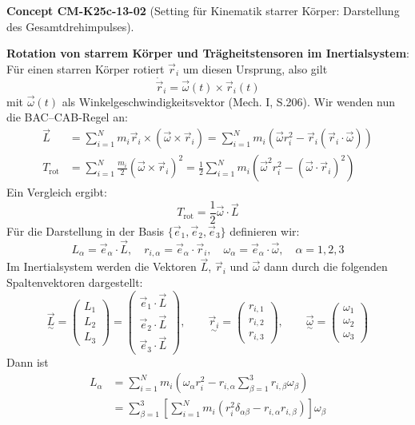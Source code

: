 \documentclass[10pt, letterpaper]{article}
\newcommand{\CustomHeading}[3]{%
  \par\medskip\noindent%
  \textbf{#1 #2} \textnormal{(#3)}.\enskip%
}
\newenvironment{CONC}[2]{\begin{unitbox}\CustomHeading{Concept}{#1}{#2}}{\end{unitbox}}
\begin{document}
\begin{CONC}{CM-K25c-13-02}{Setting für Kinematik starrer Körper: Darstellung des Gesamtdrehimpulses}
\textbf{Rotation von starrem Körper und Trägheitstensoren im Inertialsystem}: Für einen starren Körper rotiert $\vec{r}_i$ um diesen Ursprung, also gilt
\[
\dot{\vec{r}}_i = \vec{\omega}(t) \times \vec{r}_i(t)
\]
mit $\vec{\omega}(t)$ als Winkelgeschwindigkeitsvektor (Mech. I, S.206). Wir wenden nun die BAC–CAB-Regel an:
\[
\begin{aligned}
\vec{L} &= \sum_{i=1}^N m_i \vec{r}_i \times (\vec{\omega} \times \vec{r}_i)
= \sum_{i=1}^N m_i \left( \vec{\omega} r_i^2 - \vec{r}_i (\vec{r}_i \cdot \vec{\omega}) \right) \\
T_{\text{rot}} &= \sum_{i=1}^N \frac{m_i}{2} (\vec{\omega} \times \vec{r}_i)^2
= \frac{1}{2} \sum_{i=1}^N m_i \left( \vec{\omega}^2 r_i^2 - (\vec{\omega} \cdot \vec{r}_i)^2 \right)
\end{aligned}
\]
Ein Vergleich ergibt:
\[
\boxed{T_{\text{rot}} = \frac{1}{2} \vec{\omega} \cdot \vec{L}}
\]
Für die Darstellung in der Basis $\{ \vec{e}_1, \vec{e}_2, \vec{e}_3 \}$ definieren wir:
\[
L_\alpha = \vec{e}_\alpha \cdot \vec{L}, \quad r_{i,\alpha} = \vec{e}_\alpha \cdot \vec{r}_i, \quad \omega_\alpha = \vec{e}_\alpha \cdot \vec{\omega}, \quad \alpha = 1,2,3
\]
Im Inertialsystem werden die Vektoren $\vec{L}$, $\vec{r}_i$ und $\vec{\omega}$ dann durch die folgenden Spaltenvektoren dargestellt:
\[
\underset{\sim}{\vec{L}} =
\begin{pmatrix}
L_1 \\
L_2 \\
L_3
\end{pmatrix}
=
\begin{pmatrix}
\vec{e}_1 \cdot \vec{L} \\
\vec{e}_2 \cdot \vec{L} \\
\vec{e}_3 \cdot \vec{L}
\end{pmatrix}, \qquad
\underset{\sim}{\vec{r}_i} =
\begin{pmatrix}
r_{i,1} \\
r_{i,2} \\
r_{i,3}
\end{pmatrix}, \qquad
\underset{\sim}{\vec{\omega}} =
\begin{pmatrix}
\omega_1 \\
\omega_2 \\
\omega_3
\end{pmatrix}
\]
Dann ist
\[
\begin{aligned}
L_\alpha &= \sum_{i=1}^N m_i \left( \omega_\alpha r_i^2 - r_{i,\alpha} \sum_{\beta=1}^3 r_{i,\beta} \omega_\beta \right) \\
&= \sum_{\beta=1}^3 \left[ \sum_{i=1}^N m_i \left( r_i^2 \delta_{\alpha\beta} - r_{i,\alpha} r_{i,\beta} \right) \right] \omega_\beta

\end{aligned}\]
\end{CONC}
\end{document}
